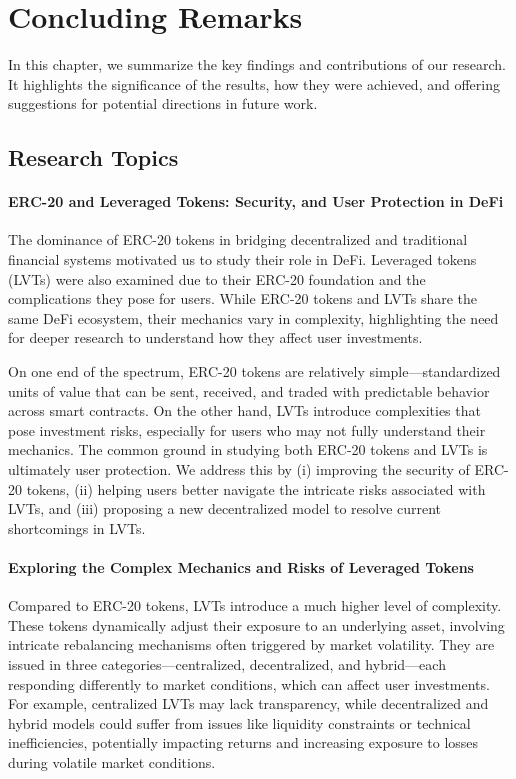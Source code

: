 
\chapter{Concluding Remarks}
In this chapter, we summarize the key findings and contributions of our research. It highlights the significance of the results, how they were achieved, and offering suggestions for potential directions in future work.

\section{Research Topics}
\subsubsection{ERC-20 and Leveraged Tokens: Security, and User Protection in DeFi}
The dominance of ERC-20 tokens in bridging decentralized and traditional financial systems motivated us to study their role in DeFi. Leveraged tokens (LVTs) were also examined due to their ERC-20 foundation and the complications they pose for users. While ERC-20 tokens and LVTs share the same DeFi ecosystem, their mechanics vary in complexity, highlighting the need for deeper research to understand how they affect user investments.

On one end of the spectrum, ERC-20 tokens are relatively simple—standardized units of value that can be sent, received, and traded with predictable behavior across smart contracts. On the other hand, LVTs introduce complexities that pose investment risks, especially for users who may not fully understand their mechanics. The common ground in studying both ERC-20 tokens and LVTs is ultimately user protection. We address this by (i) improving the security of ERC-20 tokens, (ii) helping users better navigate the intricate risks associated with LVTs, and (iii) proposing a new decentralized model to resolve current shortcomings in LVTs.

\subsubsection{Exploring the Complex Mechanics and Risks of Leveraged Tokens}
Compared to ERC-20 tokens, LVTs introduce a much higher level of complexity. These tokens dynamically adjust their exposure to an underlying asset, involving intricate rebalancing mechanisms often triggered by market volatility. They are issued in three categories—centralized, decentralized, and hybrid—each responding differently to market conditions, which can affect user investments. For example, centralized LVTs may lack transparency, while decentralized and hybrid models could suffer from issues like liquidity constraints or technical inefficiencies, potentially impacting returns and increasing exposure to losses during volatile market conditions.

